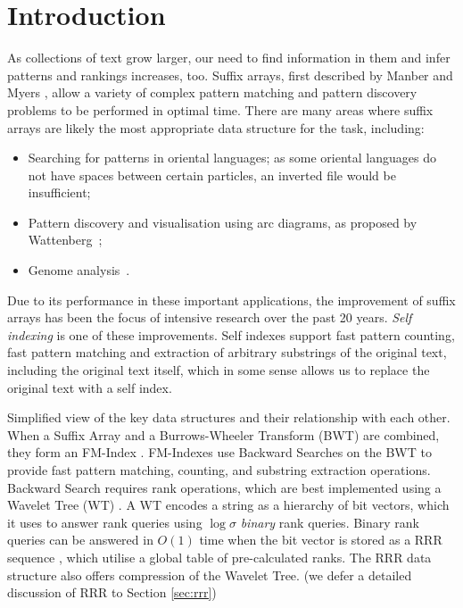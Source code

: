 \section{Introduction}

As collections of text grow larger, our need to find information in them
and infer patterns and rankings increases, too. Suffix arrays, first
described by Manber and Myers \cite{manber1993}, allow a variety of complex 
pattern matching and pattern discovery problems to be performed in optimal time. 
There are many areas where suffix arrays are likely the most appropriate data 
structure for the task, including:

\begin{itemize}
\item
	Searching for patterns in oriental languages; as some oriental languages
    do not have spaces between certain particles, an inverted file would be
    insufficient;
\item
	Pattern discovery and visualisation using arc diagrams, as proposed by
    Wattenberg~\cite{wattenberg2002};
\item
	Genome analysis~\cite{abouelhoda2004, flicek2009}.
\end{itemize}

Due to its performance in these important applications, the improvement of 
suffix arrays has been the focus of intensive research over the past 20 years. 
\emph{Self indexing} is one of these improvements. Self indexes support 
fast pattern counting, fast pattern matching and extraction of arbitrary 
substrings of the original text, including the original text itself, which in 
some sense allows us to replace the original text with a self index.

	{Simplified view of the key data structures and their relationship
	with each other. When a Suffix Array and a Burrows-Wheeler 
	Transform (BWT) \cite{burrows1994} are combined, they form an FM-Index 
	\cite{ferragina2000}. FM-Indexes use 
	Backward Searches on the BWT to provide fast pattern 
	matching, counting, and substring extraction operations. Backward
	Search requires rank operations, which are best implemented using
	a Wavelet Tree (WT) \cite{grossi2003}. A WT encodes a string as a hierarchy of bit vectors, 
	which it uses to answer rank queries using $\log \sigma$ \emph{binary} rank 
	queries. Binary rank queries can be answered in $O(1)$ time when the bit 
	vector is stored as a RRR sequence \cite{raman2007}, which utilise a global 
	table of pre-calculated ranks. The RRR data structure also offers 
	compression of the Wavelet Tree. (we defer a detailed discussion of RRR to
	Section \ref{sec:rrr})}

